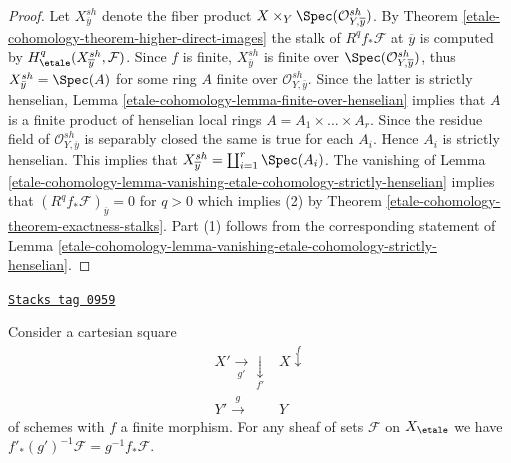 \begin{proof}
Let $X_{\overline{y}}^{sh}$ denote the fiber product
$X \times_Y \Spec(\mathcal{O}_{Y, \overline{y}}^{sh})$.
By Theorem \ref{etale-cohomology-theorem-higher-direct-images}
the stalk of $R^qf_*\mathcal{F}$ at $\overline{y}$ is computed by
$H_\etale^q(X_{\overline{y}}^{sh}, \mathcal{F})$.
Since $f$ is finite, $X_{\bar y}^{sh}$ is finite over
$\Spec(\mathcal{O}_{Y, \overline{y}}^{sh})$, thus
$X_{\bar y}^{sh} = \Spec(A)$ for some ring $A$
finite over $\mathcal{O}_{Y, \bar y}^{sh}$.
Since the latter is strictly henselian,
Lemma \ref{etale-cohomology-lemma-finite-over-henselian}
implies that $A$ is a finite product of henselian local rings
$A = A_1 \times \ldots \times A_r$. Since the residue field of
$\mathcal{O}_{Y, \overline{y}}^{sh}$ is separably closed the
same is true for each $A_i$. Hence $A_i$ is strictly henselian.
This implies that $X_{\overline{y}}^{sh} = \coprod_{i = 1}^r \Spec(A_i)$.
The vanishing of
Lemma \ref{etale-cohomology-lemma-vanishing-etale-cohomology-strictly-henselian}
implies that $(R^qf_*\mathcal{F})_{\overline{y}} = 0$ for $q > 0$
which implies (2) by Theorem \ref{etale-cohomology-theorem-exactness-stalks}.
Part (1) follows from the corresponding statement of
Lemma \ref{etale-cohomology-lemma-vanishing-etale-cohomology-strictly-henselian}.
\end{proof}

\begin{lemma}
\label{etale-cohomology-lemma-finite-pushforward-commutes-with-base-change}
\href{https://stacks.math.columbia.edu/tag/0959}{\texttt{Stacks tag 0959}}

Consider a cartesian square
$$
\begin{array}{cc}X' \underset{g'}{\longrightarrow}\underset{f'}{\downarrow} & X \overset{f}{\downarrow} \\ Y' \overset{g}{\longrightarrow} & Y\end{array}
$$
of schemes with $f$ a finite morphism.
For any sheaf of sets $\mathcal{F}$ on $X_\etale$ we have
$f'_*(g')^{-1}\mathcal{F} = g^{-1}f_*\mathcal{F}$.
\end{lemma}


